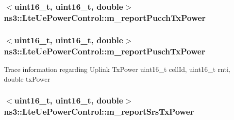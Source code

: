 \subsubsection[{\texorpdfstring{m\+\_\+report\+Pucch\+Tx\+Power}{m_reportPucchTxPower}}]{$<$uint16\+\_\+t, uint16\+\_\+t, double$>$ ns3\+::\+Lte\+Ue\+Power\+Control\+::m\+\_\+report\+Pucch\+Tx\+Power\hspace{0.3cm}{\ttfamily [private]}}\hypertarget{classns3_1_1LteUePowerControl_a327b43591fbfc775bca9a4948a57489e}{}\label{classns3_1_1LteUePowerControl_a327b43591fbfc775bca9a4948a57489e}
\subsubsection[{\texorpdfstring{m\+\_\+report\+Pusch\+Tx\+Power}{m_reportPuschTxPower}}]{$<$uint16\+\_\+t, uint16\+\_\+t, double$>$ ns3\+::\+Lte\+Ue\+Power\+Control\+::m\+\_\+report\+Pusch\+Tx\+Power\hspace{0.3cm}{\ttfamily [private]}}\hypertarget{classns3_1_1LteUePowerControl_af7702b77c409754f3edf7c887073207d}{}\label{classns3_1_1LteUePowerControl_af7702b77c409754f3edf7c887073207d}
Trace information regarding Uplink Tx\+Power uint16\+\_\+t cell\+Id, uint16\+\_\+t rnti, double tx\+Power 
\subsubsection[{\texorpdfstring{m\+\_\+report\+Srs\+Tx\+Power}{m_reportSrsTxPower}}]{$<$uint16\+\_\+t, uint16\+\_\+t, double$>$ ns3\+::\+Lte\+Ue\+Power\+Control\+::m\+\_\+report\+Srs\+Tx\+Power\hspace{0.3cm}{\ttfamily [private]}}\hypertarget{classns3_1_1LteUePowerControl_a1eed65ba5f8536af5999b925dc73bdad}{}\label{classns3_1_1LteUePowerControl_a1eed65ba5f8536af5999b925dc73bdad}

